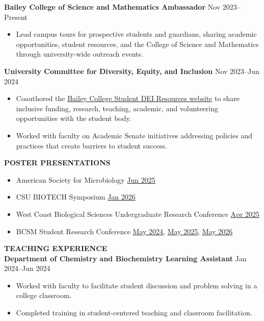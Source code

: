 \documentclass[10pt]{article}
\begin{document}
\textbf{Bailey College of Science and Mathematics Ambassador}
\hfill
Nov 2023--Present
\begin{itemize}
  \item Lead campus tours for prospective students and guardians, sharing academic opportunities, student resources, and the College of Science and Mathematics through university-wide outreach events.
\end{itemize}

\textbf{University Committee for Diversity, Equity, and Inclusion}
\hfill
Nov 2023--Jun 2024
\begin{itemize}
  \item Coauthored the \href{https://cosam.calpoly.edu/diversity/students}{Bailey College Student DEI Resources website} to share inclusive funding, research, teaching, academic, and volunteering opportunities with the student body.
  \item Worked with faculty on Academic Senate initiatives addressing policies and practices that create barriers to student success.
\end{itemize}

\textbf{POSTER PRESENTATIONS}
\hrulefill
\begin{itemize}
  \item American Society for Microbiology \hfill \href{https://jinsko.com/conferences/asm.pdf}{Jun 2025}
  \item CSU BIOTECH Symposium \hfill \href{https://jinsko.com/conferences/csu-biotech-poster.pdf}{Jan 2026}
  \item West Coast Biological Sciences Undergraduate Research Conference \hfill \href{https://jinsko.com/conferences/west-coast-biological-sciences-undergraduate-research-conference.pdf}{Apr 2025}
  \item BCSM Student Research Conference \hfill \href{https://jinsko.com/conferences/bcsm-2024.pdf}{May 2024}, \href{https://jinsko.com/conferences/bcsm-2025.pdf}{May 2025}, \href{https://jinsko.com/conferences/bcsm-2026.pdf}{May 2026}
\end{itemize}

\textbf{TEACHING EXPERIENCE}
\hrulefill\\
\textbf{Department of Chemistry and Biochemistry Learning Assistant}
\hfill
Jan 2024--Jun 2024
\begin{itemize}
  \item Worked with faculty to facilitate student discussion and problem solving in a college classroom.
  \item Completed training in student-centered teaching and classroom facilitation.
\end{itemize}
\end{document}
